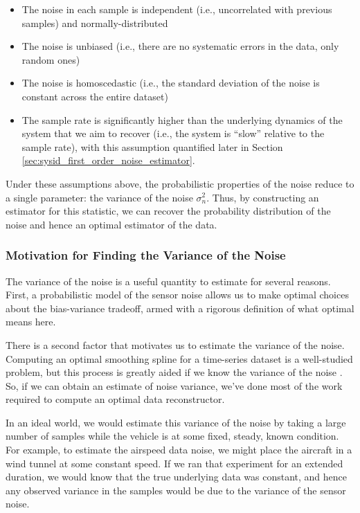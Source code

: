 \begin{itemize}
    \item The noise in each sample is independent (i.e., uncorrelated with previous samples) and normally-distributed
    \item The noise is unbiased (i.e., there are no systematic errors in the data, only random ones)
    \item The noise is homoscedastic (i.e., the standard deviation of the noise is constant across the entire dataset)
    \item The sample rate is significantly higher than the underlying dynamics of the system that we aim to recover (i.e., the system is ``slow'' relative to the sample rate), with this assumption quantified later in Section \ref{sec:sysid_first_order_noise_estimator}.
\end{itemize}

Under these assumptions above, the probabilistic properties of the noise reduce to a single parameter: the variance of the noise $\sigma^2_n$. Thus, by constructing an estimator for this statistic, we can recover the probability distribution of the noise and hence an optimal estimator of the data.

\subsubsection{Motivation for Finding the Variance of the Noise}

The variance of the noise is a useful quantity to estimate for several reasons. First, a probabilistic model of the sensor noise allows us to make optimal choices about the bias-variance tradeoff, armed with a rigorous definition of what optimal means here.

There is a second factor that motivates us to estimate the variance of the noise. Computing an optimal smoothing spline for a time-series dataset is a well-studied problem, but this process is greatly aided if we know the variance of the noise \cite{wahba}. So, if we can obtain an estimate of noise variance, we've done most of the work required to compute an optimal data reconstructor.

In an ideal world, we would estimate this variance of the noise by taking a large number of samples while the vehicle is at some fixed, steady, known condition. For example, to estimate the airspeed data noise, we might place the aircraft in a wind tunnel at some constant speed. If we ran that experiment for an extended duration, we would know that the true underlying data was constant, and hence any observed variance in the samples would be due to the variance of the sensor noise.

